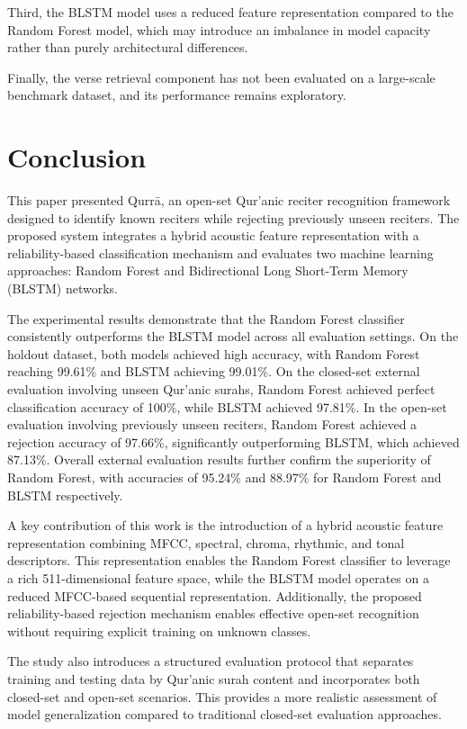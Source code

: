 \documentclass[conference]{IEEEtran}
\begin{document}
Third, the BLSTM model uses a reduced feature representation compared to the Random Forest model, which may introduce an imbalance in model capacity rather than purely architectural differences.

Finally, the verse retrieval component has not been evaluated on a large-scale benchmark dataset, and its performance remains exploratory.

\section{Conclusion}
\fontsize{11}{13}\selectfont

This paper presented Qurr\={a}, an open-set Qur'anic reciter recognition framework designed to identify known reciters while rejecting previously unseen reciters. The proposed system integrates a hybrid acoustic feature representation with a reliability-based classification mechanism and evaluates two machine learning approaches: Random Forest and Bidirectional Long Short-Term Memory (BLSTM) networks.

The experimental results demonstrate that the Random Forest classifier consistently outperforms the BLSTM model across all evaluation settings. On the holdout dataset, both models achieved high accuracy, with Random Forest reaching 99.61\% and BLSTM achieving 99.01\%. On the closed-set external evaluation involving unseen Qur'anic surahs, Random Forest achieved perfect classification accuracy of 100\%, while BLSTM achieved 97.81\%. In the open-set evaluation involving previously unseen reciters, Random Forest achieved a rejection accuracy of 97.66\%, significantly outperforming BLSTM, which achieved 87.13\%. Overall external evaluation results further confirm the superiority of Random Forest, with accuracies of 95.24\% and 88.97\% for Random Forest and BLSTM respectively.

A key contribution of this work is the introduction of a hybrid acoustic feature representation combining MFCC, spectral, chroma, rhythmic, and tonal descriptors. This representation enables the Random Forest classifier to leverage a rich 511-dimensional feature space, while the BLSTM model operates on a reduced MFCC-based sequential representation. Additionally, the proposed reliability-based rejection mechanism enables effective open-set recognition without requiring explicit training on unknown classes.

The study also introduces a structured evaluation protocol that separates training and testing data by Qur'anic surah content and incorporates both closed-set and open-set scenarios. This provides a more realistic assessment of model generalization compared to traditional closed-set evaluation approaches.
\end{document}
